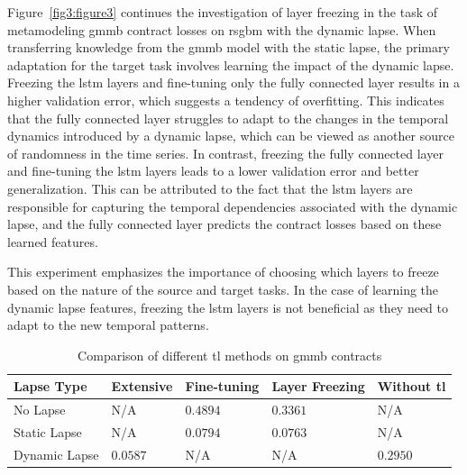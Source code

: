 Figure~\ref{fig3:figure3} continues the investigation of layer freezing in the task of metamodeling \gls{gmmb} contract losses on \gls{rsgbm} with the dynamic lapse. 
When transferring knowledge from the \gls{gmmb} model with the static lapse, the primary adaptation for the target task involves learning the impact of the dynamic lapse.
Freezing the \gls{lstm} layers and fine-tuning only the fully connected layer results in a higher validation error, which suggests a tendency of overfitting.
This indicates that the fully connected layer struggles to adapt to the changes in the temporal dynamics introduced by a dynamic lapse, which can be viewed as another source of randomness in the time series.
In contrast, freezing the fully connected layer and fine-tuning the \gls{lstm} layers leads to a lower validation error and better generalization. 
This can be attributed to the fact that the \gls{lstm} layers are responsible for capturing the temporal dependencies associated with the dynamic lapse, and the fully connected layer predicts the contract losses based on these learned features.

This experiment emphasizes the importance of choosing which layers to freeze based on the nature of the source and target tasks. 
In the case of learning the dynamic lapse features, freezing the \gls{lstm} layers is not beneficial as they need to adapt to the new temporal patterns.

\begin{table}[ht!]
    \centering
    \begin{tabular}{lllll}
    \toprule
    \textbf{Lapse Type} & \textbf{Extensive} & \textbf{Fine-tuning} & \textbf{Layer Freezing} & \textbf{Without \gls{tl}} \\
    \midrule
    No Lapse & N/A & $0.4894$ & $0.3361$ & N/A \\
    Static Lapse & N/A & $0.0794$ & $0.0763$ & N/A \\
    Dynamic Lapse & $0.0587$ &  N/A &  N/A & $0.2950$ \\
    \bottomrule
    \end{tabular}
    \caption{Comparison of different \gls{tl} methods on \gls{gmmb} contracts}
    \label{tab3:transfer_learning_results}
\end{table}

